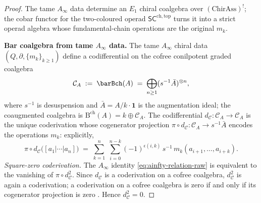 \begin{proof}
The tame \(A_\infty\) data determine an \(E_1\) chiral coalgebra over
\((\mathrm{ChirAss})^!\); the cobar functor for the two-coloured
operad \(\mathsf{SC}^{\mathrm{ch,top}}\) turns it into a strict operad
algebra whose fundamental-chain operations are the original \(m_k\).

\medskip
\textbf{Bar coalgebra from tame \(A_\infty\) data.}
The tame $A_\infty$ chiral data $(Q, \partial, \{m_k\}_{k \ge 1})$
define a codifferential on the cofree conilpotent graded coalgebra
\[
 \mathcal{C}_A \;:=\; \barBch(A)
 \;=\; \bigoplus_{n \ge 1} (s^{-1}\bar{A})^{\otimes n},
\]
where $s^{-1}$ is desuspension and $\bar{A} = A / k\cdot\mathbf{1}$
is the augmentation ideal; the coaugmented coalgebra is
$\mathrm B^{\mathrm{ch}}(A)=k\oplus\mathcal C_A$. The codifferential
$d_{\mathcal{C}} \colon \mathcal{C}_A \to \mathcal{C}_A$
is the unique coderivation whose cogenerator projection
$\pi \circ d_{\mathcal{C}} \colon \mathcal{C}_A \to s^{-1}\bar{A}$
encodes the operations $m_k$: explicitly,
\[
 \pi \circ d_{\mathcal{C}}\bigl(
 [a_1 | \cdots | a_n]\bigr)
 \;=\; \sum_{k=1}^{n}\;\sum_{i=0}^{n-k}
 (-1)^{\epsilon(i,k)}\,
 s^{-1}\,m_k(a_{i+1}, \ldots, a_{i+k}).
\]
\emph{Square-zero coderivation.} The $A_\infty$ identity
\eqref{eq:ainfty-relation-raw} is equivalent to the vanishing of
$\pi \circ d_{\mathcal{C}}^2$. Since $d_{\mathcal{C}}$ is a
coderivation on a cofree coalgebra, $d_{\mathcal{C}}^2$ is again a
coderivation; a coderivation on a cofree coalgebra is zero if and
only if its cogenerator projection is zero \cite{LV12}. Hence
$d_{\mathcal{C}}^2 = 0$.


\end{proof}
